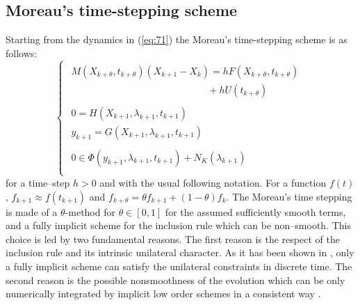 \subsection{Moreau's time-stepping scheme}


Starting from the dynamics in (\ref{eq:71}) the Moreau's time-stepping scheme  is as follows:
\label{section24}
\begin{equation}
  \label{eq:71-discrete}
 \left\{ \begin{array}{l}
    \begin{array}{l}
  M(X_{k+\theta},t_{k+\theta}) (X_{k+1}-X_{k}) = h F(X_{k+\theta},t_{k+\theta}) \\
  \qquad  \qquad  \qquad  \qquad \qquad  \qquad  \qquad + h U(t_{k+\theta})
\end{array}\\[2mm]
  \begin{array}{l}
    0 = H(X_{k+1},\lambda_{k+1},t_{k+1})\\
    y_{k+1} = G(X_{k+1},\lambda_{k+1},t_{k+1}) 
  \end{array} \\[5mm]
  \begin{array}{l}
  0 \in \Phi(y_{k+1},\lambda_{k+1},t_{k+1}) + N_K(\lambda_{k+1})
\end{array} \\
\end{array}\right.
\end{equation}
for a time--step $h>0$ and with the usual following notation. For a function $f(t)$, $ f_{k+1} \approx f(t_{k+1})$ and $f_{k+\theta} = \theta f_{k+1} + (1-\theta) f_{k}$. The Moreau's time stepping is made of a $\theta$-method for $\theta \in [0,1]$ for the assumed sufficiently smooth terms, and a fully implicit scheme for the inclusion rule which can be non--smooth. This choice is led by two fundamental reasons. The first reason is the respect of the inclusion rule and its intrinsic unilateral character.  As it has been shown in \cite{Moreau1977},  only a fully implicit scheme can satisfy the unilateral constraints in discrete time. The second reason is the possible nonsmoothness of the evolution  which  can be only  numerically integrated by implicit low order schemes in a consistent way \cite{acary-brogliato2008}.

